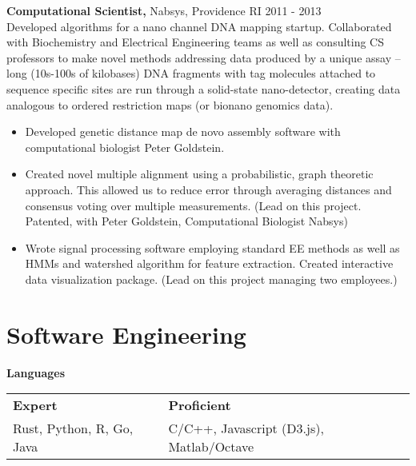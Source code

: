 \documentclass[10pt]{res}
\begin{document}
\begin{resume}
{\bf Computational Scientist,} Nabsys, Providence RI \hfill 2011 - 2013 \\
Developed algorithms for a nano channel DNA mapping startup. Collaborated with Biochemistry and Electrical Engineering teams as well as consulting CS professors to make novel methods addressing data produced by a unique assay -- long (10s-100s of kilobases) DNA fragments with tag molecules attached to sequence specific sites are run through a solid-state nano-detector, creating data analogous to ordered restriction maps (or bionano genomics data). \\

\begin{itemize} %
\item Developed genetic distance map de novo assembly software with computational biologist Peter Goldstein. 
\item Created novel multiple alignment using a probabilistic, graph theoretic approach. This allowed us to reduce error through averaging distances and consensus voting over multiple measurements. (Lead on this project. Patented, with Peter Goldstein, Computational Biologist Nabsys)
\item Wrote signal processing software employing standard EE methods as well as HMMs and watershed algorithm for feature extraction. Created interactive data visualization package. (Lead on this project managing two employees.)
\end{itemize}

\section{Software Engineering}
{\bf Languages}
\begin{tabular}{l l}
{\bf Expert} & {\bf Proficient} \\
Rust, Python, R, Go, Java & C/C++, Javascript (D3.js), Matlab/Octave \\
\end{tabular}


\end{resume}
\end{document}
